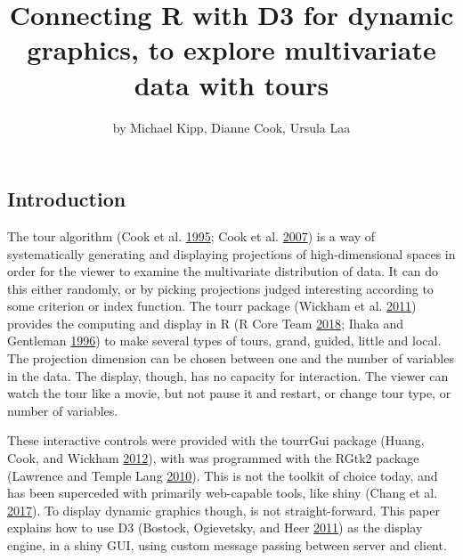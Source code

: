 \title{Connecting R with D3 for dynamic graphics, to explore multivariate data
with tours}
\author{by Michael Kipp, Dianne Cook, Ursula Laa}

\maketitle


\subsection{Introduction}\label{introduction}

The tour algorithm (Cook et al. \protect\hyperlink{ref-gt_pp}{1995};
Cook et al. \protect\hyperlink{ref-gt_pp_mc}{2007}) is a way of
systematically generating and displaying projections of high-dimensional
spaces in order for the viewer to examine the multivariate distribution
of data. It can do this either randomly, or by picking projections
judged interesting according to some criterion or index function. The
tourr package (Wickham et al. \protect\hyperlink{ref-tourr}{2011})
provides the computing and display in R (R Core Team
\protect\hyperlink{ref-R}{2018}; Ihaka and Gentleman
\protect\hyperlink{ref-ihaka:1996}{1996}) to make several types of
tours, grand, guided, little and local. The projection dimension can be
chosen between one and the number of variables in the data. The display,
though, has no capacity for interaction. The viewer can watch the tour
like a movie, but not pause it and restart, or change tour type, or
number of variables.

These interactive controls were provided with the tourrGui package
(Huang, Cook, and Wickham \protect\hyperlink{ref-tourrGui}{2012}), with
was programmed with the RGtk2 package (Lawrence and Temple Lang
\protect\hyperlink{ref-RGtk2}{2010}). This is not the toolkit of choice
today, and has been superceded with primarily web-capable tools, like
shiny (Chang et al. \protect\hyperlink{ref-shiny}{2017}). To display
dynamic graphics though, is not straight-forward. This paper explains
how to use D3 (Bostock, Ogievetsky, and Heer
\protect\hyperlink{ref-D3}{2011}) as the display engine, in a shiny GUI,
using custom message passing between server and client.

